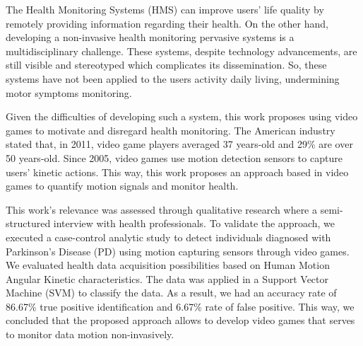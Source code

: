 
The  Health Monitoring Systems (HMS) can improve users' life quality by remotely providing information regarding their health. On the other hand, developing a non-invasive health monitoring pervasive systems is a multidisciplinary challenge. These systems, despite technology advancements, are still visible and stereotyped which complicates its dissemination. So, these systems have not been applied to the users activity daily living, undermining motor symptoms monitoring.

Given the difficulties of developing such a system, this work proposes using video games to motivate and disregard health monitoring. The American industry stated that, in 2011, video game players averaged 37 years-old and 29\% are over 50 years-old. Since 2005, video games use motion detection sensors to capture users' kinetic actions. This way, this work proposes an approach based in video games to quantify motion signals and monitor health.

This work's relevance was assessed through qualitative research where a semi-structured interview with health professionals. To validate the approach, we executed a case-control analytic study to detect individuals diagnosed with Parkinson's Disease (PD) using motion capturing sensors through video games. We evaluated health data acquisition possibilities based on Human Motion Angular Kinetic characteristics. The data was applied in a Support Vector Machine (SVM) to classify the data. As a result, we had an accuracy rate of 86.67\% true positive identification and 6.67\% rate of false positive. This way, we concluded that the proposed approach allows to develop video games that serves to monitor data motion non-invasively.